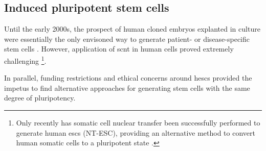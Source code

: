 


\newpage

\subsection{Induced pluripotent stem cells}
\label{sec:ipsc}

Until the early 2000s, the prospect of human cloned embryos explanted in culture were essentially the only envisoned way to generate patient- or disease-specific stem cells \cite{yamanaka2007strategies}.
However, application of \gls{scnt} in human cells proved extremely challenging \cite{fulka2013ups}\footnote{Only recently has somatic cell nuclear transfer been successfully performed to generate human \glspl{esc} (NT-ESC), providing an alternative method to convert human somatic cells to a pluripotent state \cite{tachibana2013human}.}. 

In parallel, funding restrictions and ethical concerns around \glspl{hesc} provided the impetus to find alternative approaches for generating stem cells with the same degree of pluripotency.\\

